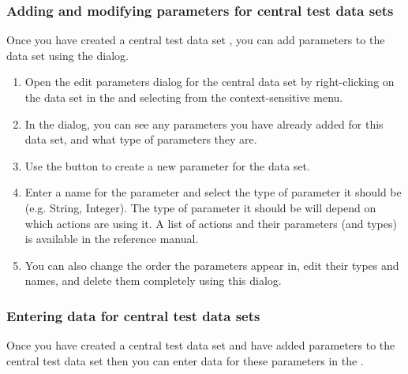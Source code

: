 \subsubsection{Adding and modifying parameters for central test data sets}
\label{TasksCentralDataEditParams}

Once you have created a central test data set , you can add parameters to the data set using the  dialog. 
\begin{enumerate}
\item Open the edit parameters dialog for the central data set by right-clicking on the data set in the \gddataeditor{} and selecting  from the context-sensitive menu. 
\item In the dialog, you can see any parameters you have already added for this data set, and what type of parameters they are. 
\item Use the  button to create a new parameter for the data set. 
\item Enter a name for the parameter and select the type of parameter it should be (e.g. String, Integer). The type of parameter it should be will depend on which actions are using it. A list of actions and their parameters (and types) is available in the reference manual.

\item You can also change the order the parameters appear in, edit their types and names, and delete them completely using this dialog. 

\end{enumerate}


\subsubsection{Entering data for central test data sets}
\label{TasksDSVCentral}

Once you have created a central test data set  and have added parameters to the central test data set  then you can enter data for these parameters in the \gddatasetsview{}.


